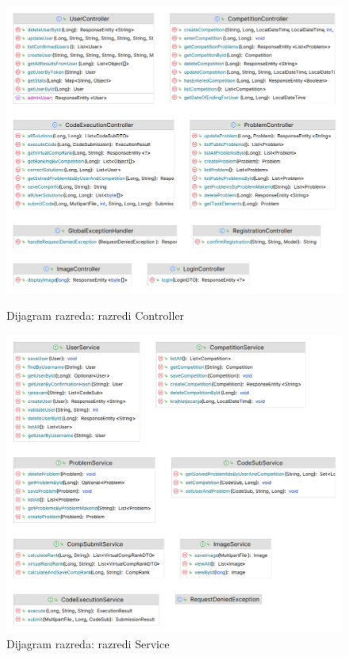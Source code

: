 			
			\begin{figure}
			\centering
			\begin{minipage}[b]{0.45\textwidth}
				\includegraphics[width=\textwidth]{slike/controlleri}
				\caption{Dijagram razreda: razredi Controller}
				\label{fig:dr1}
			\end{minipage}
			\hfill
			\begin{minipage}[b]{0.45\textwidth}
				\includegraphics[width=\textwidth]{slike/services}
				\caption{Dijagram razreda: razredi Service}
					\label{fig:dr}
			\end{minipage}
			\end{figure}
			
